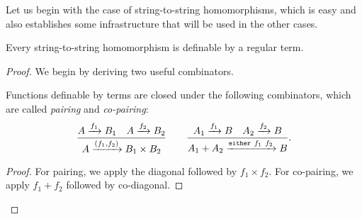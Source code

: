 Let us begin with the case of string-to-string homomorphisms, which is easy and also establishes some infrastructure that will be used in the other cases.



\begin{lemma}\label{lem:terms-define-string-homomorphisms}
        Every string-to-string homomorphism is definable by a regular term.
\end{lemma}
\begin{proof} We begin by deriving two useful combinators.

    \begin{claim}\label{claim:pairing-copairing}
        Functions definable by terms are closed under the following combinators, which are called \emph{pairing} and \emph{co-pairing}:
        \begin{align*}
        \frac{ A \xrightarrow {f_1} B_1 \quad A \xrightarrow {f_2} B_2}
        { A \xrightarrow {(f_1,f_2)} B_1 \times B_2}
        \qquad
        \frac{ A_1 \xrightarrow {f_1} B \quad A_2 \xrightarrow {f_2} B}
        { A_1 + A_2 \xrightarrow {\mathtt{either}\ f_1\ f_2} B}.
        \end{align*}
    \end{claim}
    \begin{proof}
        For pairing, we apply the diagonal followed by  $f_1 \times f_2$.  For co-pairing, we apply $f_1 + f_2$ followed by  co-diagonal.
    \end{proof}


\end{proof}
